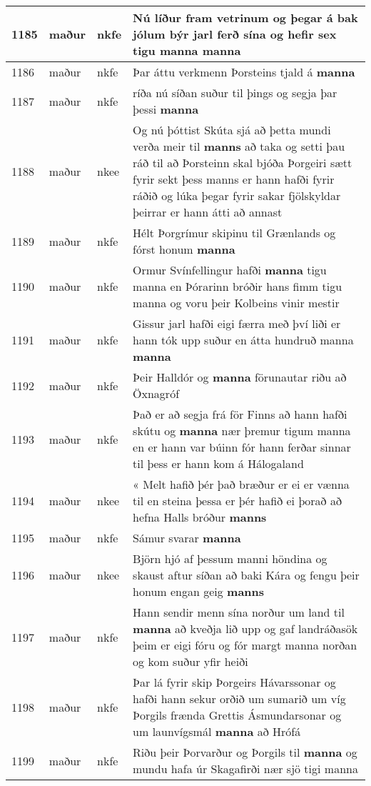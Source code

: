 \documentclass{article}
\begin{document}
\begin{longtable}{p{1cm}|p{1cm}|p{1cm}|p{13cm}}
\hline
1185&maður&nkfe&Nú líður fram vetrinum og þegar á bak jólum býr jarl ferð sína og hefir sex tigu manna \textbf{manna} \\
\hline
1186&maður&nkfe&Þar áttu verkmenn Þorsteins tjald á \textbf{manna} \\
\hline
1187&maður&nkfe&ríða nú síðan suður til þings og segja þar þessi \textbf{manna} \\
\hline
1188&maður&nkee&Og nú þóttist Skúta sjá að þetta mundi verða meir til \textbf{manns} að taka og setti þau ráð til að Þorsteinn skal bjóða Þorgeiri sætt fyrir sekt þess manns er hann hafði fyrir ráðið og lúka þegar fyrir sakar fjölskyldar þeirrar er hann átti að annast\\
\hline
1189&maður&nkfe&Hélt Þorgrímur skipinu til Grænlands og fórst honum \textbf{manna} \\
\hline
1190&maður&nkfe&Ormur Svínfellingur hafði \textbf{manna} tigu manna en Þórarinn bróðir hans fimm tigu manna og voru þeir Kolbeins vinir mestir\\
\hline
1191&maður&nkfe&Gissur jarl hafði eigi færra með því liði er hann tók upp suður en átta hundruð manna \textbf{manna} \\
\hline
1192&maður&nkfe&Þeir Halldór og \textbf{manna} förunautar riðu að Öxnagróf\\
\hline
1193&maður&nkfe&Það er að segja frá för Finns að hann hafði skútu og \textbf{manna} nær þremur tigum manna en er hann var búinn fór hann ferðar sinnar til þess er hann kom á Hálogaland\\
\hline
1194&maður&nkee&« Melt hafið þér það bræður er ei er vænna til en steina þessa er þér hafið ei þorað að hefna Halls bróður \textbf{manns} \\
\hline
1195&maður&nkfe&Sámur svarar \textbf{manna} \\
\hline
1196&maður&nkee&Björn hjó af þessum manni höndina og skaust aftur síðan að baki Kára og fengu þeir honum engan geig \textbf{manns} \\
\hline
1197&maður&nkfe&Hann sendir menn sína norður um land til \textbf{manna} að kveðja lið upp og gaf landráðasök þeim er eigi fóru og fór margt manna norðan og kom suður yfir heiði\\
\hline
1198&maður&nkfe&Þar lá fyrir skip Þorgeirs Hávarssonar og hafði hann sekur orðið um sumarið um víg Þorgils frænda Grettis Ásmundarsonar og um launvígsmál \textbf{manna} að Hrófá\\
\hline
1199&maður&nkfe&Riðu þeir Þorvarður og Þorgils til \textbf{manna} og mundu hafa úr Skagafirði nær sjö tigi manna\\

\end{longtable}
\end{document}
